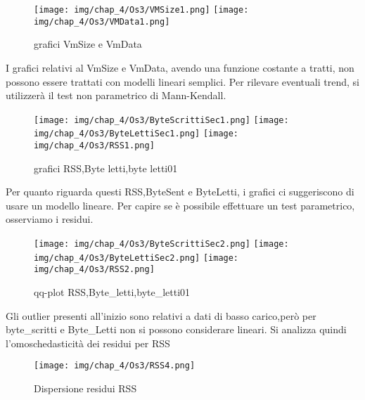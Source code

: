 \begin{figure}[H]
    \centering
    \texttt{[image: img/chap\_4/Os3/VMSize1.png]}
    \texttt{[image: img/chap\_4/Os3/VMData1.png]}
    \caption{grafici VmSize e VmData}
    \label{fig:sis_2_25_k}
\end{figure}
\noindent
I grafici relativi al VmSize e VmData, avendo una funzione costante a tratti, non possono essere trattati con modelli lineari semplici.
Per rilevare eventuali trend, si utilizzerà il test non parametrico di Mann-Kendall.
\begin{figure}[H]
    \centering
    \texttt{[image: img/chap\_4/Os3/ByteScrittiSec1.png]}
    \texttt{[image: img/chap\_4/Os3/ByteLettiSec1.png]}
    \texttt{[image: img/chap\_4/Os3/RSS1.png]}
    \caption{grafici RSS,Byte letti,byte letti01}
    \label{fig:sis_2_25_k}
\end{figure}
\noindent
Per quanto riguarda questi RSS,ByteSent e ByteLetti, i grafici ci suggeriscono di usare un modello lineare. Per capire se è possibile effettuare un test parametrico, osserviamo i residui.
\begin{figure}[H]
    \centering
    \texttt{[image: img/chap\_4/Os3/ByteScrittiSec2.png]}
    \texttt{[image: img/chap\_4/Os3/ByteLettiSec2.png]}
    \texttt{[image: img/chap\_4/Os3/RSS2.png]}
    \caption{qq-plot RSS,Byte\_letti,byte\_letti01}
    \label{fig:residui}
\end{figure}
\noindent
Gli outlier presenti all'inizio sono relativi a dati di basso carico,però per byte\_scritti e Byte\_Letti 
non si possono considerare lineari.
Si analizza quindi l'omoschedasticità dei residui per RSS
\begin{figure}[H]
    \centering
    \texttt{[image: img/chap\_4/Os3/RSS4.png]}
    \caption{Dispersione residui RSS}
    \label{fig:residui_non_omoschedastici}
\end{figure}
\noindent

